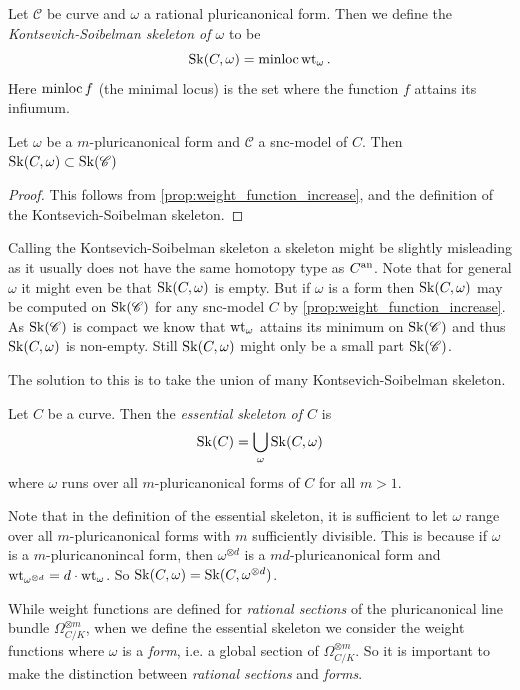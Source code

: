 \begin{definition}\label{def:KS_skeleton}
	Let $\mathscr C $ be curve and $\omega$ a rational pluricanonical form. 
	Then we define the \emph{Kontsevich-Soibelman skeleton of $\omega$} to be \[
		\operatorname{Sk}(C, \omega) = \operatorname{minloc} \operatorname{wt}_{\omega}
	.\]  
	Here $\operatorname{minloc} f$ (the minimal locus) is the set where the function $f$ attains its infiumum.
\end{definition}
\begin{lemma}
	Let $\omega$ be a $m$-pluricanonical form and $\mathscr C$ a snc-model of $C$. 
	Then $\operatorname{Sk}(C, \omega) \subset  \operatorname{Sk}(\mathscr C)$
\end{lemma}
\begin{proof}
	This follows from \cref{prop:weight_function_increase}, and the definition of the Kontsevich-Soibelman skeleton. 
\end{proof}
Calling the Kontsevich-Soibelman skeleton a skeleton might be slightly misleading as it usually does not have the same homotopy type as $C{}^{\text{an}}$. 
Note that for general $\omega$ it might even be that $\operatorname{Sk}(C, \omega)$ is empty. 
But if $\omega$ is a form then $\operatorname{Sk}(C, \omega)$ may be computed on $\operatorname{Sk} (\mathscr C)$ for any snc-model $C$ by \cref{prop:weight_function_increase}. 
As $\operatorname{Sk}(\mathscr C)$ is compact we know that $\operatorname{wt}_{\omega}$ attains its minimum on $\operatorname{Sk}(\mathscr C)$ and thus $\operatorname{Sk}(C, \omega)$ is non-empty. 
Still $\operatorname{Sk}(C, \omega)$ might only be a small part $\operatorname{Sk}(\mathscr C)$. 

The solution to this is to take the union of many Kontsevich-Soibelman skeleton.
\begin{definition}
	Let $C$ be a curve. 
	Then the \emph{essential skeleton of $C$} is \[
		\operatorname{Sk}(C) = \bigcup_{\omega} \operatorname{Sk}(C, \omega)
	\] 
	where $\omega$ runs over all $m$-pluricanonical forms of $C$ for all $m > 1$. 
\end{definition}
\begin{remark}\label{rem:sufficiently_divisible_pluriconanonical}
	Note that in the definition of the essential skeleton, it is sufficient to let $\omega$ range over all $m$-pluricanonical forms with $m$ sufficiently divisible. 
	This is because if $\omega$ is a $m$-pluricanonincal form, then $\omega^{\otimes d}$ is a $md$-pluricanonical form and $\operatorname{wt}_{\omega^{\otimes d}} = d\cdot \operatorname{wt}_{\omega}$. 
	So $\operatorname{Sk}(C, \omega) = \operatorname{Sk}(C, \omega^{\otimes d})$. 
\end{remark}
\begin{remark}
	While weight functions are defined for \emph{rational sections} of the pluricanonical line bundle $\Omega_{C / K}^{\otimes m}$, when we define the essential skeleton we consider the weight functions where $\omega$ is a \emph{form}, i.e. a global section of $\Omega_{C / K} ^{\otimes m}$. 
	So it is important to make the distinction between \emph{rational sections} and \emph{forms}.
\end{remark}

